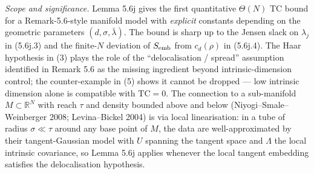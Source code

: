 \documentclass[
]{article}
\begin{document}

\emph{Scope and significance.} Lemma 5.6j gives the first
quantitative $\Theta(N)$ TC bound for a Remark-5.6-style manifold
model with \emph{explicit} constants depending on the geometric
parameters $(d, \sigma, \bar\lambda)$. The bound is sharp up to the
Jensen slack on $\lambda_j$ in (5.6j.3) and the finite-$N$ deviation
of $S_{\rm emb}$ from $c_d(\rho)$ in (5.6j.4). The Haar hypothesis in
(3) plays the role of the ``delocalisation / spread'' assumption
identified in Remark 5.6 as the missing ingredient beyond
intrinsic-dimension control; the counter-example in (5) shows it
cannot be dropped --- low intrinsic dimension alone is compatible
with $\mathrm{TC} = 0$. The connection to a sub-manifold $M \subset
\mathbb{R}^N$ with reach $\tau$ and density bounded above and below
(Niyogi--Smale--Weinberger 2008; Levina--Bickel 2004) is via local
linearisation: in a tube of radius $\sigma \ll \tau$ around any base
point of $M$, the data are well-approximated by their tangent-Gaussian
model with $U$ spanning the tangent space and $\Lambda$ the local
intrinsic covariance, so Lemma 5.6j applies whenever the local
tangent embedding satisfies the delocalisation hypothesis.
\end{document}
